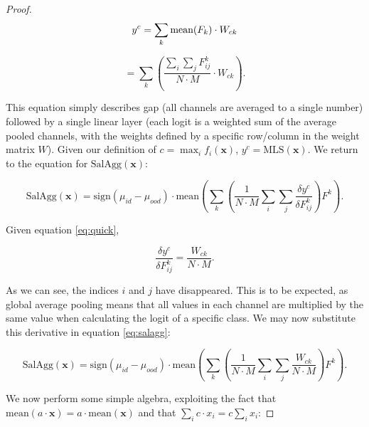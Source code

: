 \documentclass[UKenglish]{uiomasterthesis} %
\theoremstyle{definition}
\begin{document}
\begin{proof}
\begin{equation}
    y^c = \sum_k \text{mean}(F_k) \cdot W_{ck} \\
\end{equation}

\begin{equation} \label{eq:quick}
    = \sum_k \left( \frac{\sum_i \sum_j F^k_{ij}}{N \cdot M} \cdot W_{ck} \right) .
\end{equation}

This equation simply describes \ac{gap} (all channels are averaged to a single number) followed by a single linear layer (each logit is a weighted sum of the average pooled channels, with the weights defined by a specific row/column in the weight matrix $W$). Given our definition of $c = \max_i f_i(\bm{x})$, $y^c = \text{MLS}(\bm{x})$. We return to the equation for $\text{SalAgg}(\bm{x})$:

\begin{equation} \label{eq:salagg}
    \text{SalAgg}(\bm{x}) = \text{sign}(\mu_{id} - \mu_{ood}) \cdot \text{mean} \left(\sum_k \left( \frac{1}{N \cdot M} \sum_i \sum_j \frac{\delta y^c}{\delta F_{ij}^k} \right) F^k \right).
\end{equation}

Given equation \ref{eq:quick},

\begin{equation}
    \frac{\delta y^c}{\delta F^k_{ij}} = \frac{W_{ck}}{N \cdot M}.
\end{equation}

As we can see, the indices $i$ and $j$ have disappeared. This is to be expected, as global average pooling means that all values in each channel are multiplied by the same value when calculating the logit of a specific class. We may now substitute this derivative in equation \ref{eq:salagg}:

\begin{equation}
    \text{SalAgg}(\bm{x}) = \text{sign}(\mu_{id} - \mu_{ood}) \cdot \text{mean} \left(\sum_k \left( \frac{1}{N \cdot M} \sum_i \sum_j \frac{W_{ck}}{N \cdot M} \right) F^k \right).
\end{equation}

We now perform some simple algebra, exploiting the fact that $\text{mean}(a \cdot \bm{x}) = a \cdot \text{mean}(\bm{x})$ and that $\sum_i c \cdot x_i = c \sum_i x_i$:


\end{proof}
\end{document}

